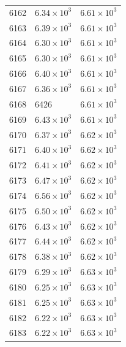\begin{table}[H]
\begin{tabular}{lll}
6162 & $\displaystyle 6.34 \times 10^{3}$ & $\displaystyle 6.61 \times 10^{3}$ \\
6163 & $\displaystyle 6.39 \times 10^{3}$ & $\displaystyle 6.61 \times 10^{3}$ \\
6164 & $\displaystyle 6.30 \times 10^{3}$ & $\displaystyle 6.61 \times 10^{3}$ \\
6165 & $\displaystyle 6.30 \times 10^{3}$ & $\displaystyle 6.61 \times 10^{3}$ \\
6166 & $\displaystyle 6.40 \times 10^{3}$ & $\displaystyle 6.61 \times 10^{3}$ \\
6167 & $\displaystyle 6.36 \times 10^{3}$ & $\displaystyle 6.61 \times 10^{3}$ \\
6168 & 6426 & $\displaystyle 6.61 \times 10^{3}$ \\
6169 & $\displaystyle 6.43 \times 10^{3}$ & $\displaystyle 6.61 \times 10^{3}$ \\
6170 & $\displaystyle 6.37 \times 10^{3}$ & $\displaystyle 6.62 \times 10^{3}$ \\
6171 & $\displaystyle 6.40 \times 10^{3}$ & $\displaystyle 6.62 \times 10^{3}$ \\
6172 & $\displaystyle 6.41 \times 10^{3}$ & $\displaystyle 6.62 \times 10^{3}$ \\
6173 & $\displaystyle 6.47 \times 10^{3}$ & $\displaystyle 6.62 \times 10^{3}$ \\
6174 & $\displaystyle 6.56 \times 10^{3}$ & $\displaystyle 6.62 \times 10^{3}$ \\
6175 & $\displaystyle 6.50 \times 10^{3}$ & $\displaystyle 6.62 \times 10^{3}$ \\
6176 & $\displaystyle 6.43 \times 10^{3}$ & $\displaystyle 6.62 \times 10^{3}$ \\
6177 & $\displaystyle 6.44 \times 10^{3}$ & $\displaystyle 6.62 \times 10^{3}$ \\
6178 & $\displaystyle 6.38 \times 10^{3}$ & $\displaystyle 6.62 \times 10^{3}$ \\
6179 & $\displaystyle 6.29 \times 10^{3}$ & $\displaystyle 6.63 \times 10^{3}$ \\
6180 & $\displaystyle 6.25 \times 10^{3}$ & $\displaystyle 6.63 \times 10^{3}$ \\
6181 & $\displaystyle 6.25 \times 10^{3}$ & $\displaystyle 6.63 \times 10^{3}$ \\
6182 & $\displaystyle 6.22 \times 10^{3}$ & $\displaystyle 6.63 \times 10^{3}$ \\
6183 & $\displaystyle 6.22 \times 10^{3}$ & $\displaystyle 6.63 \times 10^{3}$ \\

\end{tabular}
\end{table}
